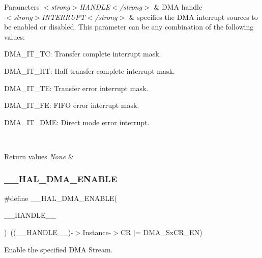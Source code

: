 \begin{DoxyParams}{Parameters}
{\em $<$strong$>$\+H\+A\+N\+D\+L\+E$<$/strong$>$} & D\+MA handle \\
\hline
{\em $<$strong$>$\+I\+N\+T\+E\+R\+R\+U\+P\+T$<$/strong$>$} & specifies the D\+MA interrupt sources to be enabled or disabled. This parameter can be any combination of the following values\+: \begin{DoxyItemize}
\item D\+M\+A\+\_\+\+I\+T\+\_\+\+TC\+: Transfer complete interrupt mask. \item D\+M\+A\+\_\+\+I\+T\+\_\+\+HT\+: Half transfer complete interrupt mask. \item D\+M\+A\+\_\+\+I\+T\+\_\+\+TE\+: Transfer error interrupt mask. \item D\+M\+A\+\_\+\+I\+T\+\_\+\+FE\+: F\+I\+FO error interrupt mask. \item D\+M\+A\+\_\+\+I\+T\+\_\+\+D\+ME\+: Direct mode error interrupt. \end{DoxyItemize}
\\
\hline
\end{DoxyParams}

\begin{DoxyRetVals}{Return values}
{\em None} & \\
\hline
\end{DoxyRetVals}
\mbox{\label{group___d_m_a_ga93900b3ef3f87ef924eb887279a434b4}} 
\subsubsection{\texorpdfstring{\+\_\+\+\_\+\+H\+A\+L\+\_\+\+D\+M\+A\+\_\+\+E\+N\+A\+B\+LE}{\_\_HAL\_DMA\_ENABLE}}
{\footnotesize\ttfamily \#define \+\_\+\+\_\+\+H\+A\+L\+\_\+\+D\+M\+A\+\_\+\+E\+N\+A\+B\+LE(\begin{DoxyParamCaption}\item[{}]{\+\_\+\+\_\+\+H\+A\+N\+D\+L\+E\+\_\+\+\_\+ }\end{DoxyParamCaption})~((\+\_\+\+\_\+\+H\+A\+N\+D\+L\+E\+\_\+\+\_\+)-\/$>$Instance-\/$>$CR $\vert$=  D\+M\+A\+\_\+\+Sx\+C\+R\+\_\+\+EN)}



Enable the specified D\+MA Stream. 



